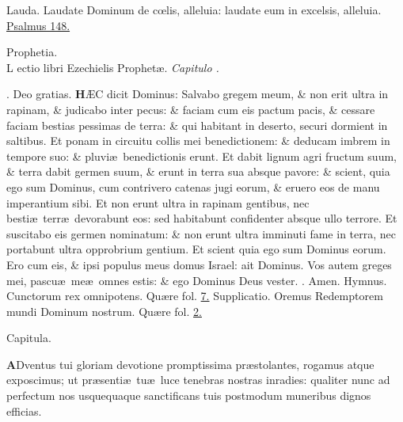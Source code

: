 \documentclass[letter,11pt]{book}
\makeatletter
\DeclareRobustCommand{\Rbar}{\vers@resp{0pt}{R}}
\newcommand{\vers@resp@sym}{\raisebox{0.2ex}{\rotatebox[origin=c]{-20}{$\m@th\rceil$}}}
\newcommand{\vers@resp}[2]{%
  {\ooalign{\hidewidth\kern#1\vers@resp@sym\hidewidth\cr#2\cr}}%
}%
\def\R{\color{Red} \Rbar . \color{black}}
\makeatother
\begin{document}
\begin{multicols}{2}
\newline \color{Red} Lauda. \color{black} Laudate Dominum de c\oe lis, alleluia: laudate eum in excelsis, alleluia. \color{Red} \hyperlink{ps148}{Psalmus 148.} \color{black}
\vspace{-.5em} \begin{center} \color{Red} \hypertarget{ezechias.34}{\label{ezechias.34}} Prophetia.\\
L\color{black} ectio libri Ezechielis Prophet\ae . \itshape Capitulo . \end{center} \vspace{-.5em}
\par \noindent \R Deo gratias.
\lettrine[lines=2]{\bfseries \color{Red} H}{}\AE C dicit Dominus: Salvabo gregem meum, \& non erit ultra in rapinam, \& judicabo inter pecus: \& faciam cum eis pactum pacis, \& cessare faciam bestias pessimas de terra: \& qui habitant in deserto, securi dormient in saltibus.
Et ponam in circuitu collis mei benedictionem: \& deducam imbrem in tempore suo: \& pluvi\ae \ benedictionis erunt. Et dabit lignum agri fructum suum, \& terra dabit germen suum, \& erunt in terra sua absque pavore: \& scient, quia ego sum Dominus, cum contrivero catenas jugi eorum, \& eruero eos de manu imperantium sibi.
Et non erunt ultra in rapinam gentibus, nec besti\ae \ terr\ae \ devorabunt eos: sed habitabunt confidenter absque ullo terrore. Et suscitabo eis germen nominatum: \& non erunt ultra imminuti fame in terra, nec portabunt ultra opprobrium gentium. Et scient quia ego sum Dominus eorum. Ero cum eis, \& ipsi populus meus domus Israel: ait Dominus. Vos autem greges mei, pascu\ae \ me\ae \ omnes estis: \& ego Dominus Deus vester.
\newline \R Amen.
\newline \color{Red} Hymnus. \color{black} Cunctorum rex omnipotens. \color{Red} Qu\ae re fol. \color{black} \hyperlink{page.7}{7.} \color{Red} Supplicatio. \color{black} Oremus Redemptorem mundi Dominum nostrum. \color{Red} Qu\ae re fol. \color{black} \hyperlink{Supplicatio}{2.}
\vspace{-.5em} \begin{center} \color{Red} Capitula. \end{center} \vspace{-.5em}
\lettrine[lines=2]{\bfseries \color{Red} A}{}Dventus tui gloriam devotione promptissima pr\ae stolantes, rogamus atque exposcimus; ut pr\ae senti\ae \ tu\ae \ luce tenebras nostras inradies: qualiter nunc ad perfectum nos usquequaque sanctificans tuis postmodum muneribus dignos efficias.

\end{multicols}
\end{document}
